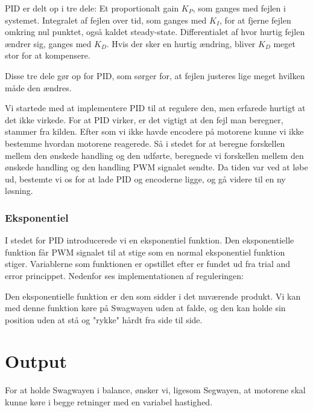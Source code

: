 \documentclass[a4paper,11pt,oneside,article,danish,table]{memoir}
\newcommand{\swino}[2]{}
\begin{document}
PID er delt op i tre dele: 
Et proportionalt gain $K_P$, som ganges med fejlen i systemet.
Integralet af fejlen over tid, som ganges med $K_I$, for at fjerne fejlen omkring nul punktet, også kaldet steady-state.
Differentialet af hvor hurtig fejlen ændrer sig, ganges med $K_D$. Hvis der sker en hurtig ændring, bliver $K_D$ meget stor for at kompensere.

Disse tre dele gør op for PID, som sørger for, at fejlen justeres lige meget hvilken måde den ændres.

Vi startede med at implementere PID til at regulere den, men erfarede hurtigt at det ikke virkede. For at PID virker, er det vigtigt at den fejl man beregner, stammer fra kilden. Efter som vi ikke havde encodere på motorene kunne vi ikke bestemme hvordan motorene reagerede. Så i stedet for at beregne forskellen mellem den ønskede handling og den udførte, beregnede vi forskellen mellem den ønskede handling og den handling PWM signalet sendte. Da tiden var ved at løbe ud, bestemte vi os for at lade PID og encoderne ligge, og gå videre til en ny løsning.
\subsection{Eksponentiel}
I stedet for PID introducerede vi en eksponentiel funktion. Den eksponentielle funktion får PWM signalet til at stige som en normal eksponentiel funktion stiger. Variablerne som funktionen er opstillet efter er fundet ud fra trial and error princippet. Nedenfor ses implementationen af reguleringen:
\swino{54}{58}

\swino{168}{180}

Den eksponentielle funktion er den som sidder i det nuværende produkt. Vi kan med denne funktion køre på Swagwayen uden at falde, og den kan holde sin position uden at stå og "rykke" hårdt fra side til side.
\chapter{Output}
For at holde Swagwayen i balance, ønsker vi, ligesom Segwayen, at motorene skal kunne køre i begge retninger med en variabel hastighed.
\end{document}
